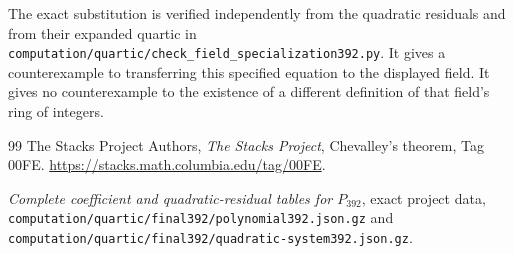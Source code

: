 \documentclass[11pt,a4paper]{article}
\theoremstyle{definition}\newtheorem{definition}[theorem]{Definition}
\theoremstyle{remark}\newtheorem{remark}[theorem]{Remark}
\begin{document}
The exact substitution is verified independently from the quadratic
residuals and from their expanded quartic in
\nolinkurl{computation/quartic/check_field_specialization392.py}.
It gives a counterexample to transferring this specified equation
to the displayed field. It gives no counterexample to the existence
of a different definition of that field's ring of integers.

\begin{thebibliography}{99}
The Stacks Project Authors, \emph{The Stacks Project},
Chevalley's theorem, Tag 00FE.
\url{https://stacks.math.columbia.edu/tag/00FE}.

\emph{Complete coefficient and quadratic-residual tables for $P_{392}$},
exact project data,
\nolinkurl{computation/quartic/final392/polynomial392.json.gz} and
\nolinkurl{computation/quartic/final392/quadratic-system392.json.gz}.
\end{thebibliography}
\end{document}
